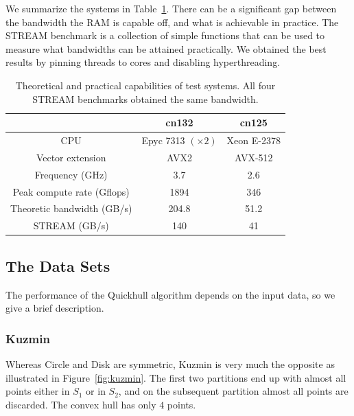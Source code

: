We summarize the systems in Table~\ref{tab:system}. There can be a significant
gap between the bandwidth the RAM is capable off, and what is achievable in
practice. The STREAM benchmark \cite{McCalpin95} is a collection of simple
functions that can be used to measure what bandwidths can be attained 
practically. We obtained the best results by pinning threads to cores and 
disabling hyperthreading.

\begin{table}[ht]
    \caption{Theoretical and practical capabilities of test systems. All four
             STREAM benchmarks obtained the same bandwidth.}
    \label{tab:system}
    \begin{tabular}{c|c|c}
                                   & cn132 & cn125          \\
        \hline                                              
        CPU                        & Epyc 7313 $(\times 2)$ 
                                           & Xeon E-2378    \\
        Vector extension           & AVX2  & AVX-512        \\
        Frequency (GHz)            & 3.7   & 2.6            \\
        Peak compute rate (Gflops) & 1894  & 346            \\
        Theoretic bandwidth (GB/s) & 204.8 & 51.2           \\ 
        STREAM (GB/s)              & 140   & 41             \\ 
    \end{tabular}
\end{table}

\subsection{The Data Sets}\label{subsec:datasets}

The performance of the Quickhull algorithm depends on the input data,
so we give a brief description. 

\subsubsection{Kuzmin}

Whereas Circle and Disk are symmetric, Kuzmin is very much the opposite
as illustrated in Figure~\ref{fig:kuzmin}.
The first two partitions end up with almost all points either in $S_1$ or
in $S_2$, and on the subsequent partition almost all points are discarded.
The convex hull has only $4$ points.

